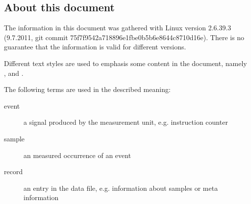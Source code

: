 
\subsection{About this document}
The information in this document was gathered with Linux version 2.6.39.3 (9.7.2011, git commit 75f7f9542a718896e1fbe0b5b6e8644c8710d16e). There is no guarantee that the information is valid for different versions.

Different text styles are used to emphasis some content in the document, namely ,  and .

The following terms are used in the described meaning:
\newcommand{\descr}[2]{\item[#1] #2}
\begin{description}
  \descr{event}{a signal produced by the measurement unit, e.g. instruction counter}
  \descr{sample}{an measured occurrence of an event}
  \descr{record}{an entry in the data file, e.g. information about samples or meta information}
\end{description}
